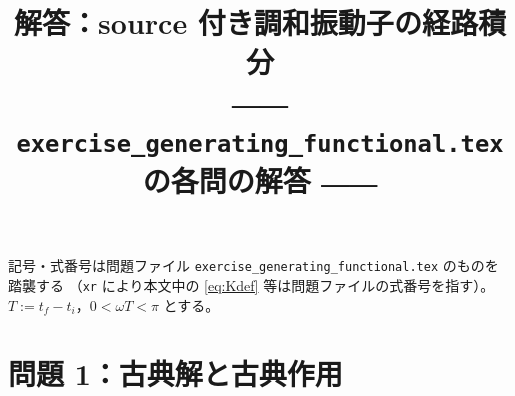 \documentclass[dvipdfmx, uplatex]{jsarticle}
\title{解答：source 付き調和振動子の経路積分\\
\large ―― \texttt{exercise\_generating\_functional.tex} の各問の解答 ――}
\author{}
\date{}
\theoremstyle{definition}
\begin{document}
\maketitle
\vspace{-6zh}

記号・式番号は問題ファイル \texttt{exercise\_generating\_functional.tex} のものを踏襲する
（\texttt{xr} により本文中の \eqref{eq:Kdef} 等は問題ファイルの式番号を指す）。
$T:=t_f-t_i$，$0<\omega T<\pi$ とする。

\tableofcontents

\section{問題 1：古典解と古典作用}
\end{document}
